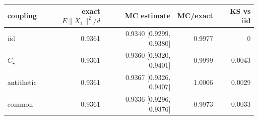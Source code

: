 \begin{tabular}{lrrrr}
\toprule
coupling & exact $E\|X_1\|^2/d$ & MC estimate & MC/exact & KS vs iid \\
\midrule
iid & 0.9361 & 0.9340 [0.9299, 0.9380] & 0.9977 & 0 \\
$C_\star$ & 0.9361 & 0.9360 [0.9320, 0.9401] & 0.9999 & 0.0043 \\
antithetic & 0.9361 & 0.9367 [0.9326, 0.9407] & 1.0006 & 0.0029 \\
common & 0.9361 & 0.9336 [0.9296, 0.9376] & 0.9973 & 0.0033 \\
\bottomrule
\end{tabular}
